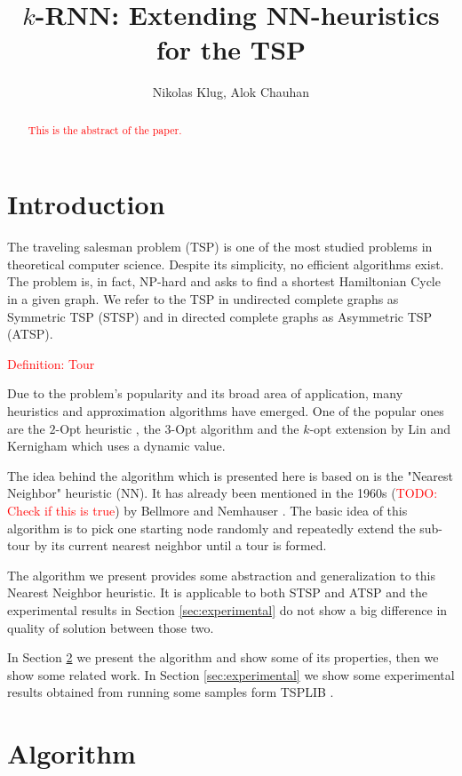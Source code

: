 \documentclass[11pt]{article}
\title{$k$-RNN: Extending NN-heuristics for the TSP}
\author{Nikolas Klug, Alok Chauhan}
\newcommand{\red}{\textcolor{red}}
\begin{document}
	\maketitle
	\begin{abstract}
		\red{This is the abstract of the paper.}
	\end{abstract}

	\section{Introduction}
	\label{sec:introduction}
	The traveling salesman problem (TSP) is one of the most studied problems in theoretical computer science. 
	Despite its simplicity, no efficient algorithms exist. 
	The problem is, in fact, NP-hard and asks to find a shortest Hamiltonian Cycle in a given graph.
	We refer to the TSP in undirected complete graphs as Symmetric TSP (STSP) and in directed complete graphs as Asymmetric TSP (ATSP).

	\red{Definition: Tour}

	Due to the problem's popularity and its broad area of application, many heuristics and approximation algorithms have emerged. One of the popular ones are the $2$-Opt heuristic \cite{CROES1958}, the $3$-Opt algorithm \cite{LIN1965} and the $k$-opt extension by Lin and Kernigham \cite{LIN1973} which uses a dynamic value.
	
	The idea behind the algorithm which is presented here is based on is the "Nearest Neighbor" heuristic (NN).
	It has already been mentioned in the 1960s (\red{TODO: Check if this is true}) by Bellmore and Nemhauser \cite{BELLMORE1968}.
	The basic idea of this algorithm is to pick one starting node randomly and repeatedly extend the sub-tour by its current nearest neighbor until a tour is formed.
	
	The algorithm we present provides some abstraction and generalization to this Nearest Neighbor heuristic. 
	It is applicable to both STSP and ATSP and the experimental results in Section \ref{sec:experimental} do not show a big difference in quality of solution between those two.
	
	In Section \ref{sec:algorithm} we present the algorithm and show some of its properties, then we show some related work. 
	In Section \ref{sec:experimental} we show some experimental results obtained from running some samples form TSPLIB \cite{REINELT1995}.
	
	\section{Algorithm}
	\label{sec:algorithm}
	
	
\end{document}
